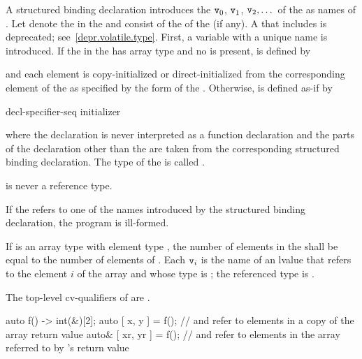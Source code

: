 \documentclass{wg21}
\begin{document}
\pnum
A structured binding declaration introduces the 
$\texttt{v}_0$, $\texttt{v}_1$, $\texttt{v}_2, \dotsc$
of the
 as names
of .
Let \cv{} denote the  in
the  and
 consist of the  of
the  (if any).
A \cv{} that includes  is deprecated;
see~\ref{depr.volatile.type}.
First, a variable with a unique name  is introduced. If the
 in the 
has array type   and no  is present,
 is defined by
\begin{ncbnf}
      \cv{}   \terminal{;}
\end{ncbnf}
and each element is copy-initialized or direct-initialized
from the corresponding element of the  as specified
by the form of the .
Otherwise, 
is defined as-if by
\begin{ncbnf}
     decl-specifier-seq   initializer \terminal{;}
\end{ncbnf}
where
the declaration is never interpreted as a function declaration and
the parts of the declaration other than the  are taken
from the corresponding structured binding declaration.
The type of the 
 is called .
\begin{note}
     is never a reference type.
\end{note}

\pnum
If the  refers to
one of the names introduced by the structured binding declaration,
the program is ill-formed.

\pnum
If  is an array type with element type , the number
of elements in the  shall be equal to the
number of elements of . Each $\texttt{v}_i$ is the name of an
lvalue that refers to the element $i$ of the array and whose type
is ; the referenced type is .
\begin{note}
    The top-level cv-qualifiers of  are \cv.
\end{note}
\begin{example}
    \begin{codeblock}
        auto f() -> int(&)[2];
        auto [ x, y ] = f();            //  and  refer to elements in a copy of the array return value
        auto& [ xr, yr ] = f();         //  and  refer to elements in the array referred to by 's return value
    \end{codeblock}
\end{example}
\end{document}
